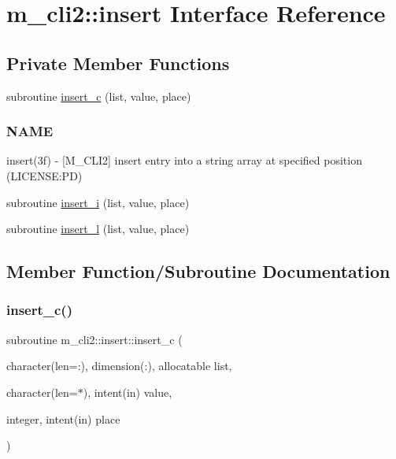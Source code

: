 \hypertarget{interfacem__cli2_1_1insert}{}\section{m\+\_\+cli2\+:\+:insert Interface Reference}
\label{interfacem__cli2_1_1insert}
\subsection*{Private Member Functions}
\begin{DoxyCompactItemize}
\item 
subroutine \mbox{\hyperlink{interfacem__cli2_1_1insert_af1a1ef419e4e9d4653fce92182e0e0c2}{insert\+\_\+c}} (list, value, place)
\begin{DoxyCompactList}\small\item\em \subsubsection*{N\+A\+ME}

insert(3f) -\/ \mbox{[}M\+\_\+\+C\+L\+I2\mbox{]} insert entry into a string array at specified position (L\+I\+C\+E\+N\+SE\+:PD) \end{DoxyCompactList}\item 
subroutine \mbox{\hyperlink{interfacem__cli2_1_1insert_a50fcaf89ea5907952b521845dd434835}{insert\+\_\+i}} (list, value, place)
\item 
subroutine \mbox{\hyperlink{interfacem__cli2_1_1insert_a48dedb7035fb157485c81de9fc245659}{insert\+\_\+l}} (list, value, place)
\end{DoxyCompactItemize}


\subsection{Member Function/\+Subroutine Documentation}
\mbox{\label{interfacem__cli2_1_1insert_af1a1ef419e4e9d4653fce92182e0e0c2}} 
\subsubsection{\texorpdfstring{insert\+\_\+c()}{insert\_c()}}
{\footnotesize\ttfamily subroutine m\+\_\+cli2\+::insert\+::insert\+\_\+c (\begin{DoxyParamCaption}\item[{character(len=\+:), dimension(\+:), allocatable}]{list,  }\item[{character(len=$\ast$), intent(in)}]{value,  }\item[{integer, intent(in)}]{place }\end{DoxyParamCaption})\hspace{0.3cm}{\ttfamily [private]}}



